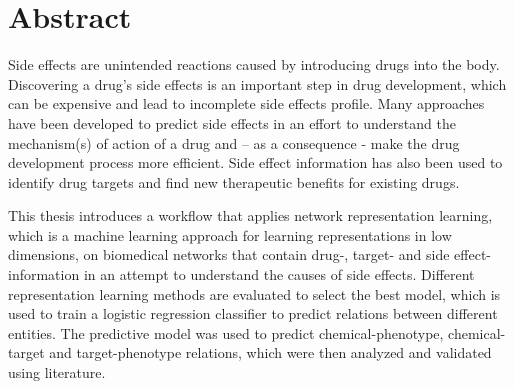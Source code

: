 \chapter*{Abstract}

Side effects are unintended reactions caused by introducing drugs into the body. Discovering a drug’s side effects is an important step in drug development, which can be expensive and lead to incomplete side effects profile. Many approaches have been developed to predict side effects in an effort to understand the mechanism(s) of action of a drug and – as a consequence - make the drug development process more efficient. Side effect information has also been used to identify drug targets and find new therapeutic benefits for existing drugs.

This thesis introduces a workflow that applies network representation learning, which is a machine learning approach for learning representations in low dimensions, on biomedical networks that contain drug-, target- and side effect-information in an attempt to understand the causes of side effects. Different representation learning methods are evaluated to select the best model, which is used to train a logistic regression classifier to predict relations between different entities. The predictive model was used to predict chemical-phenotype, chemical-target and target-phenotype relations, which were then analyzed and validated using literature. 
